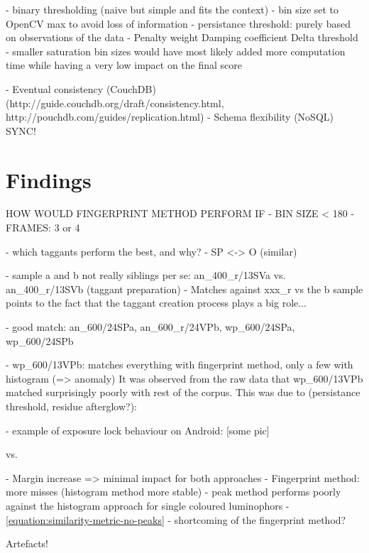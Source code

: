 \documentclass[thesis.tex]{subfiles}
\begin{document}
- binary thresholding (naive but simple and fits the context)
- bin size set to OpenCV max to avoid loss of information
- persistance threshold: purely based on observations of the data
- Penalty weight Damping coefficient Delta threshold
- smaller saturation bin sizes would have most likely added more computation time while having a very low impact on the final score

- Eventual consistency (CouchDB) (http://guide.couchdb.org/draft/consistency.html, http://pouchdb.com/guides/replication.html)
- Schema flexibility (NoSQL) SYNC!

\section{Findings}
\label{chapter:findings}

HOW WOULD FINGERPRINT METHOD PERFORM IF
- BIN SIZE < 180
- FRAMES: 3 or 4

- which taggants perform the best, and why?
- SP <-> O (similar)

- sample a and b not really siblings per se: an\_400\_r/13SVa vs. an\_400\_r/13SVb (taggant preparation)
- Matches against xxx\_r vs the b sample points to the fact that the taggant creation process plays a big role...

- good match: an\_600/24SPa, an\_600\_r/24VPb, wp\_600/24SPa, wp\_600/24SPb

- wp\_600/13VPb: matches everything with fingerprint method, only a few with histogram (=> anomaly)
It was observed from the raw data that wp\_600/13VPb matched surprisingly poorly with rest of the corpus. This was due to (persistance threshold, residue afterglow?):

- example of exposure lock behaviour on Android: [some pic]

vs.

- Margin increase => minimal impact for both approaches
- Fingerprint method: more misses (histogram method more stable)
- peak method performs poorly against the histogram approach for single coloured luminophors
- \ref{equation:similarity-metric-no-peaks} - shortcoming of the fingerprint method?

Artefacts!
\end{document}
